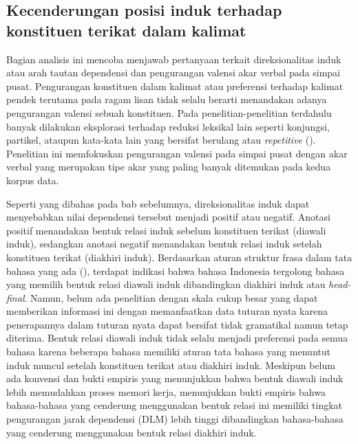 \subsection{Kecenderungan posisi induk terhadap konstituen terikat dalam kalimat}
Bagian analisis ini mencoba menjawab pertanyaan terkait direksionalitas induk atau arah tautan dependensi dan pengurangan valensi akar verbal pada simpai pusat. Pengurangan konstituen dalam kalimat atau preferensi terhadap kalimat pendek terutama pada ragam lisan tidak selalu berarti menandakan adanya pengurangan valensi sebuah konstituen. Pada penelitian-penelitian terdahulu banyak dilakukan eksplorasi terhadap reduksi leksikal lain seperti konjungsi, partikel, ataupun kata-kata lain yang bersifat berulang atau \textit{repetitive} (\citealp{jaeger2006redundancy, gildea2015human}). Penelitian ini memfokuskan pengurangan valensi pada simpai pusat dengan akar verbal yang merupakan tipe akar yang paling banyak ditemukan pada kedua korpus data. 

Seperti yang dibahas pada bab sebelumnya, direksionalitas induk dapat menyebabkan nilai dependensi tersebut menjadi positif atau negatif. Anotasi positif menandakan bentuk relasi induk sebelum konstituen terikat (diawali induk), sedangkan anotasi negatif menandakan bentuk relasi induk setelah konstituen terikat (diakhiri induk). Berdasarkan aturan struktur frasa dalam tata bahasa yang ada (\citealp{kridalaksana2002struktur, sneddon2010indonesian}), terdapat indikasi bahwa bahasa Indonesia tergolong bahasa yang memilih bentuk relasi diawali induk dibandingkan diakhiri induk atau \textit{head-final}. Namun, belum ada penelitian dengan skala cukup besar yang dapat memberikan informasi ini dengan memanfaatkan data tuturan nyata karena penerapannya dalam tuturan nyata dapat bersifat tidak gramatikal namun tetap diterima. Bentuk relasi diawali induk tidak selalu menjadi preferensi pada semua bahasa karena beberapa bahasa memiliki aturan tata bahasa yang menuntut induk muncul setelah konstituen terikat atau diakhiri induk. Meskipun belum ada konvensi dan bukti empiris yang menunjukkan bahwa bentuk diawali induk lebih memudahkan proses memori kerja, \cite{futrell2015large} menunjukkan bukti empiris bahwa bahasa-bahasa yang cenderung menggunakan bentuk relasi ini memiliki tingkat pengurangan jarak dependensi (DLM) lebih tinggi dibandingkan bahasa-bahasa yang cenderung menggunakan bentuk relasi diakhiri induk. 

